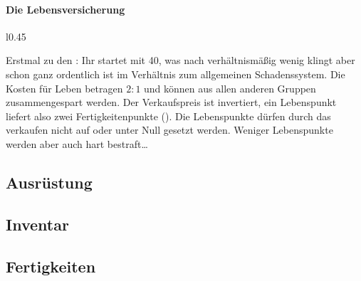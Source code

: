 \paragraph{Die Lebensversicherung}
\begin{wrapfigure}{l}{0.45\linewidth}
    \centering{}
\end{wrapfigure}
Erstmal zu den : 
Ihr startet mit 40, was nach verhältnismäßig wenig klingt aber schon ganz ordentlich ist im Verhältnis zum allgemeinen Schadenssystem. %
Die Kosten für Leben betragen \(2:1\) und können aus allen anderen Gruppen zusammengespart werden. Der Verkaufspreis ist invertiert, ein Lebenspunkt liefert also zwei Fertigkeitenpunkte (\SP).
Die Lebenspunkte dürfen durch das verkaufen nicht auf oder unter Null gesetzt werden. Weniger Lebenspunkte werden aber auch hart bestraft\ldots

\subsection{Ausrüstung}

\subsection{Inventar}

\subsection{Fertigkeiten}